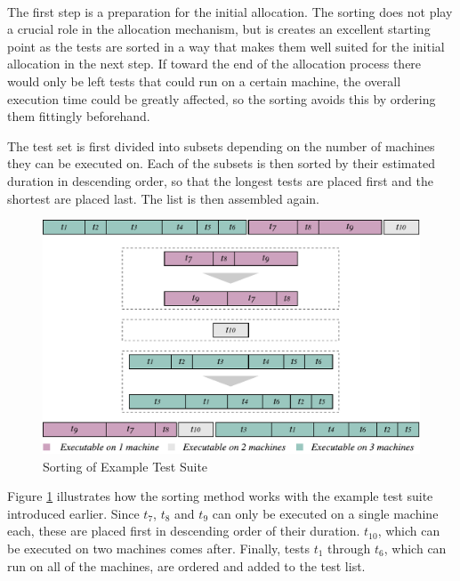 
\noindent \textbf{}\\
\noindent The first step is a preparation for the initial allocation. The sorting does not play a crucial role in the allocation mechanism, but is creates an excellent starting point as the tests are sorted in a way that makes them well suited for the initial allocation in the next step. If toward the end of the allocation process there would only be left tests that could run on a certain machine, the overall execution time could be greatly affected, so the sorting avoids this by ordering them fittingly beforehand.

The test set is first divided into subsets depending on the number of machines they can be executed on. Each of the subsets is then sorted by their estimated duration in descending order, so that the longest tests are placed first and the shortest are placed last. The list is then assembled again.

\begin{figure}[ptb]
    \centering
    \includegraphics[width=\textwidth]{figures/new/sorting.pdf}
    \caption{Sorting of Example Test Suite}
    \label{fig.sorted_test_suite}
\end{figure}

Figure \ref{fig.sorted_test_suite} illustrates how the sorting method works with the example test suite introduced earlier. Since $t_{7}$, $t_{8}$ and $t_{9}$ can only be executed on a single machine each, these are placed first in descending order of their duration. $t_{10}$, which can be executed on two machines comes after. Finally, tests $t_{1}$ through $t_{6}$, which can run on all of the machines, are ordered and added to the test list.






